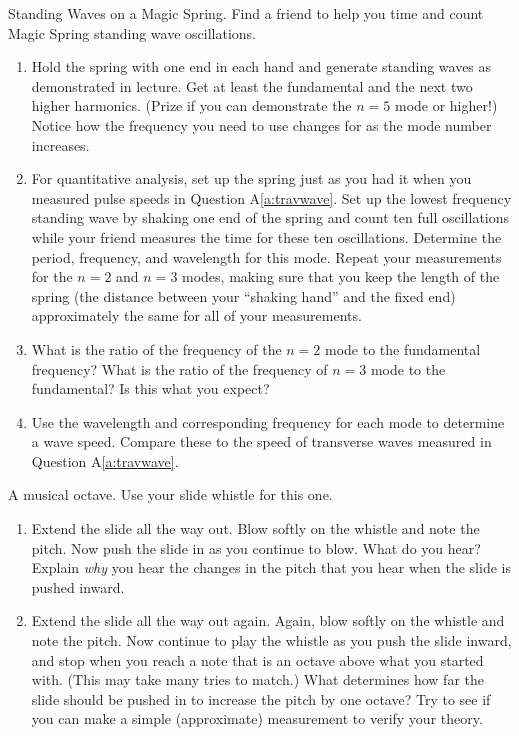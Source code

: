 \begin{aproblem}{Standing Waves on a Magic Spring.}  
  Find a friend to help you time and count Magic Spring standing wave
  oscillations.
  \begin{enumerate}
  \item Hold the spring with one end in each hand and generate
    standing waves as demonstrated in lecture.  Get at least the
    fundamental and the next two higher harmonics.  (Prize if you can
    demonstrate the $n=5$ mode or higher!)  Notice how the frequency
    you need to use changes for as the mode number increases.
  \item For quantitative analysis, set up the spring just as you had
    it when you measured pulse speeds in Question A\ref{a:travwave}.
    Set up the lowest frequency standing wave by shaking one end of
    the spring and count ten full oscillations while your friend
    measures the time for these ten oscillations.  Determine the
    period, frequency, and wavelength for this mode.  Repeat your
    measurements for the $n=2$ and $n=3$ modes, making sure that you
    keep the length of the spring (the distance between your ``shaking
    hand'' and the fixed end) approximately the same for all of your
    measurements.
  \item What is the ratio of the frequency of the $n = 2$ mode to the
    fundamental frequency?  What is the ratio of the frequency of $n =
    3$ mode to the fundamental?  Is this what you expect?
  \item Use the wavelength and corresponding frequency for each mode
    to determine a wave speed.  Compare these to the speed of
    transverse waves measured in Question A\ref{a:travwave}.
  \end{enumerate}
  \label{a:standingwave}
\end{aproblem}


\begin{aproblem}{A musical octave.}  
  Use your slide whistle for this one.
  \begin{enumerate}
  \item Extend the slide all the way out.  Blow softly on the whistle
    and note the pitch.  Now push the slide in as you continue to
    blow.  What do you hear?  Explain {\it why} you hear the changes
    in the pitch that you hear when the slide is pushed inward.
  \item Extend the slide all the way out again.  Again, blow softly on
    the whistle and note the pitch.  Now continue to play the whistle
    as you push the slide inward, and stop when you reach a note that
    is an octave above what you started with. (This may take many
    tries to match.)  What determines how far the slide should be
    pushed in to increase the pitch by one octave?  Try to see if you
    can make a simple (approximate) measurement to verify your theory.
  \end{enumerate}
\end{aproblem}


